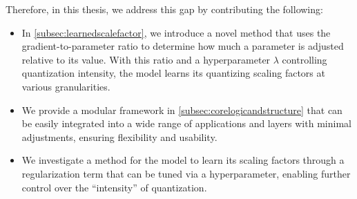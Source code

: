 Therefore, in this thesis, we address this gap by contributing the following:
\begin{itemize}
    \item In \cref{subsec:learnedscalefactor}, we introduce a novel method that uses the gradient-to-parameter ratio to determine how much a parameter is adjusted relative to its value. With this ratio and a hyperparameter 
    \( \lambda \) controlling quantization intensity, the model learns its quantizing scaling factors at various granularities.
    \item We provide a modular framework in \cref{subsec:corelogicandstructure} that can be easily integrated into a wide range of applications and layers
    with minimal adjustments, ensuring flexibility and usability.
    \item We investigate a method for the model to learn its scaling factors through a regularization term that can be tuned via a hyperparameter, enabling further control over the “intensity” of quantization.
\end{itemize}
 